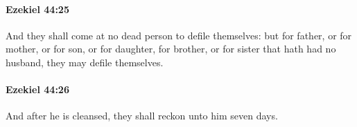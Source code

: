		\paragraph{Ezekiel 44:25} %
			\label{EZEKIEL-44-25}

			And they shall come at no dead person to defile themselves: but for father, or for mother, or for son, or for daughter, for brother, or for sister that hath had no husband, they may defile themselves.


		\paragraph{Ezekiel 44:26} %
			\label{EZEKIEL-44-26}

			And after he is cleansed, they shall reckon unto him seven days.


